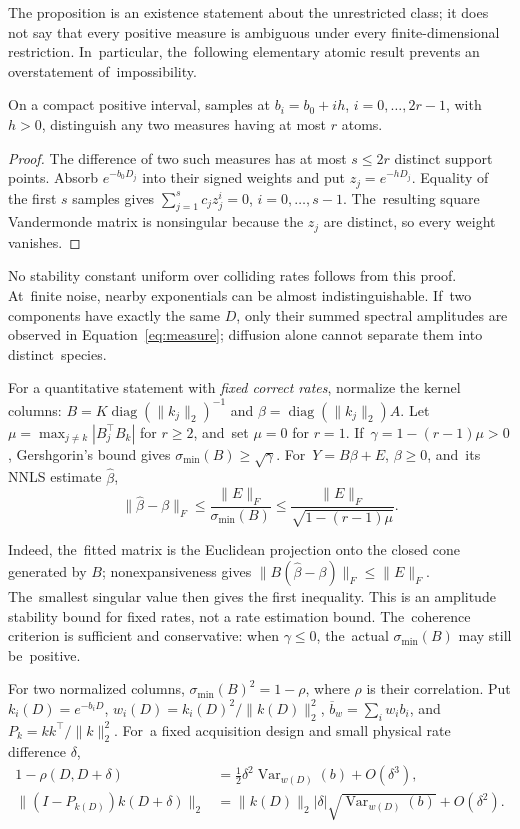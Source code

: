 \documentclass[mathematics,article,accept,moreauthors]{Definitions/mdpi}
\newcommand{\diag}{\operatorname{diag}}
\begin{document}
The proposition is an existence statement about the unrestricted class; it does not say that every positive measure is ambiguous under every finite-dimensional restriction. In~particular, the~following elementary atomic result prevents an overstatement of~impossibility.

\begin{Proposition}\label{prop:atomic}
On a compact positive interval, samples at $b_i=b_0+ih$, $i=0,\ldots,2r-1$, with~$h>0$, distinguish any two measures having at most $r$ atoms.
\end{Proposition}
\begin{proof}
The difference of two such measures has at most $s\leq2r$ distinct support points. Absorb $e^{-b_0D_j}$ into their signed weights and put $z_j=e^{-hD_j}$. Equality of the first $s$ samples gives $\sum_{j=1}^s c_j z_j^i=0$, $i=0,\ldots,s-1$. The~resulting square Vandermonde matrix is nonsingular because the $z_j$ are distinct, so every weight vanishes.
\end{proof}

No stability constant uniform over colliding rates follows from this proof. At~finite noise, nearby exponentials can be almost indistinguishable. If~two components have exactly the same $D$, only their summed spectral amplitudes are observed in Equation~\eqref{eq:measure}; diffusion alone cannot separate them into distinct~species.

For a quantitative statement with \emph{fixed correct rates}, normalize the kernel columns: $B=K\diag(\|k_j\|_2)^{-1}$ and $\beta=\diag(\|k_j\|_2)A$. Let $\mu=\max_{j\ne k}|B_j^\top B_k|$ for $r\geq2$, and~set $\mu=0$ for $r=1$. If~$\gamma=1-(r-1)\mu>0$, Gershgorin's bound gives $\sigma_{\min}(B)\geq\sqrt{\gamma}$. For~$Y=B\beta+E$, $\beta\geq0$, and~its NNLS estimate $\widehat\beta$,
\[
 \|\widehat\beta-\beta\|_F
 \leq\frac{\|E\|_F}{\sigma_{\min}(B)}
 \leq\frac{\|E\|_F}{\sqrt{1-(r-1)\mu}}.
\]

Indeed, the~fitted matrix is the Euclidean projection onto the closed cone generated by $B$; nonexpansiveness gives $\|B(\widehat\beta-\beta)\|_F\leq\|E\|_F$. The~smallest singular value then gives the first inequality. This is an amplitude stability bound for fixed rates, not a rate estimation bound. The~coherence criterion is sufficient and conservative: when $\gamma\leq0$, the~actual $\sigma_{\min}(B)$ may still be~positive.

For two normalized columns, $\sigma_{\min}(B)^2=1-\rho$, where $\rho$ is their correlation. Put $k_i(D)=e^{-b_iD}$, $w_i(D)=k_i(D)^2/\|k(D)\|_2^2$, $\overline b_w=\sum_iw_ib_i$, and~$P_k=kk^\top/\|k\|_2^2$. For~a fixed acquisition design and small physical rate difference $\delta$,
\[
 \begin{aligned}
 1-\rho(D,D+\delta)
 &=\tfrac12\delta^2\operatorname{Var}_{w(D)}(b)+O(\delta^3),\\
 \|(I-P_{k(D)})k(D+\delta)\|_2
 &=\|k(D)\|_2|\delta|\sqrt{\operatorname{Var}_{w(D)}(b)}+O(\delta^2).
 \end{aligned}
\]
\end{document}
